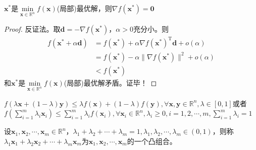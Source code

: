 \begin{theorem}[无约束优化问题]
    $\boldsymbol{x}^*$是$\min\limits_{\boldsymbol{x}\in\mathbb{R}^n}f(\boldsymbol{x})$(局部)最优解，则$\nabla f(\boldsymbol{x}^*) = \boldsymbol{0}$
\end{theorem}
\begin{proof}
    反证法。取$\boldsymbol{d} = -\nabla f(\boldsymbol{x}^*)$，$\alpha>0$充分小。则
    \[
        \begin{array}{ll}
            f(\boldsymbol{x}^*+\alpha\boldsymbol{d})&=f(\boldsymbol{x}^*)+\alpha\nabla f(\boldsymbol{x}^*)^\mathrm{T}\boldsymbol{d}+o(\alpha)\\
            &=f(\boldsymbol{x}^*)-\alpha\|\nabla f(\boldsymbol{x}^*)\|^2+o(\alpha)\\
            &<f(\boldsymbol{x}^*)
        \end{array}
    \]
    和$\boldsymbol{x}^*$是$\min\limits_{\boldsymbol{x}\in\mathbb{R}^n}f(\boldsymbol{x})$(局部)最优解矛盾。证毕！
\end{proof}
\begin{definition}[凸函数]
    $f\left(\lambda\boldsymbol{x}+(1-\lambda)\boldsymbol{y}\right)\leqslant\lambda f(\boldsymbol{x})+(1-\lambda)f(\boldsymbol{y}),\forall\boldsymbol{x},\boldsymbol{y}\in\mathbb{R}^n,\lambda\in[0,1]$或者$f\left(\sum\limits_{i=1}^m\lambda_i\boldsymbol{x}_i\right)\leqslant\sum\limits_{i=1}^m\lambda_if(\boldsymbol{x}_i),\forall \boldsymbol{x}_i\in\mathbb{R}^n,\lambda_i\geqslant 0,i=1,2,\cdots,m,\sum\limits_{i=1}^m\lambda_i=1$
\end{definition}
\begin{definition}[凸组合]
    设$\boldsymbol{x}_1,\boldsymbol{x}_2,\cdots ,\boldsymbol{x}_m\in\mathbb{R}^n$，$\lambda_{1}+\lambda_{2}+\cdots+\lambda_{m}=1,\lambda_{1},\lambda_{2},\cdots,\lambda_{m}\in (0,1)$，则称$\lambda_1\boldsymbol{x}_1+\lambda_2\boldsymbol{x}_2+\cdots+\lambda_m\boldsymbol{x}_m$为$\boldsymbol{x}_1,\boldsymbol{x}_2,\cdots ,\boldsymbol{x}_m$的一个凸组合。
\end{definition}
